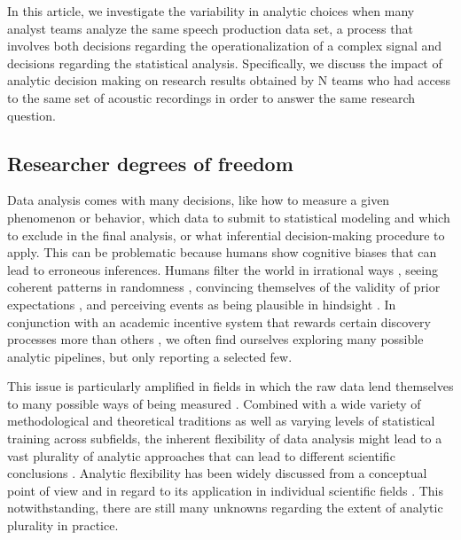 \documentclass[Review,times,sageh]{sagej}
\begin{document}
In this article, we investigate the variability in analytic choices when many analyst teams analyze the same speech production data set, a process that involves both decisions regarding the operationalization of a complex signal and decisions regarding the statistical analysis.
Specifically, we discuss the impact of analytic decision making on research results obtained by N teams who had access to the same set of acoustic recordings in order to answer the same research question.

\hypertarget{researcher-degrees-of-freedom}{%
\subsection{Researcher degrees of freedom}\label{researcher-degrees-of-freedom}}

Data analysis comes with many decisions, like how to measure a given phenomenon or behavior, which data to submit to statistical modeling and which to exclude in the final analysis, or what inferential decision-making procedure to apply.
This can be problematic because humans show cognitive biases that can lead to erroneous inferences.
Humans filter the world in irrational ways \citep[e.g.,][]{tversky1974judgment}, seeing coherent patterns in randomness \citep{brugger2001}, convincing themselves of the validity of prior expectations \citep[``I knew it'',][]{nickerson1998confirmation}, and perceiving events as being plausible in hindsight \citep[``I knew it all along'',][]{fischhoff1975hindsight}.
In conjunction with an academic incentive system that rewards certain discovery processes more than others \citep{sterling1959publication, koole2012rewarding}, we often find ourselves exploring many possible analytic pipelines, but only reporting a selected few.

This issue is particularly amplified in fields in which the raw data lend themselves to many possible ways of being measured \citep{roettger2019researcher}.
Combined with a wide variety of methodological and theoretical traditions as well as varying levels of statistical training across subfields, the inherent flexibility of data analysis might lead to a vast plurality of analytic approaches that can lead to different scientific conclusions \citep{roettger2019emergent}.
Analytic flexibility has been widely discussed from a conceptual point of view \citep{simmons2011false, wagenmakers2012agenda, nosek2014method} and in regard to its application in individual scientific fields \citep[e.g.][]{wicherts2016, charles2019, roettger2019researcher}.
This notwithstanding, there are still many unknowns regarding the extent of analytic plurality in practice.
\end{document}
